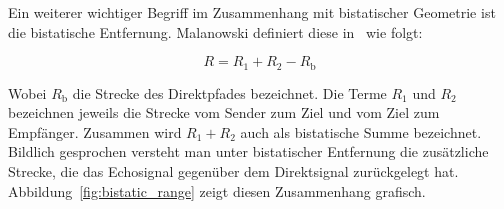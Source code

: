 Ein weiterer wichtiger Begriff im Zusammenhang mit bistatischer Geometrie ist die bistatische Entfernung. Malanowski definiert diese in~\cite[S.~10]{Malanowski2019} wie folgt:

\begin{equation}
    R = R_1 + R_2 - R_\text{b}
\end{equation}\label{eq:bistatic_range}

Wobei \(R_\text{b}\) die Strecke des Direktpfades bezeichnet. Die Terme \(R_1\) und \(R_2\) bezeichnen jeweils die Strecke vom Sender zum Ziel und vom Ziel zum Empfänger. Zusammen wird \(R_1 + R_2\) auch als bistatische Summe bezeichnet. Bildlich gesprochen versteht man unter bistatischer Entfernung die zusätzliche Strecke, die das Echosignal gegenüber dem Direktsignal zurückgelegt hat. Abbildung~\ref{fig:bistatic_range} zeigt diesen Zusammenhang grafisch.


